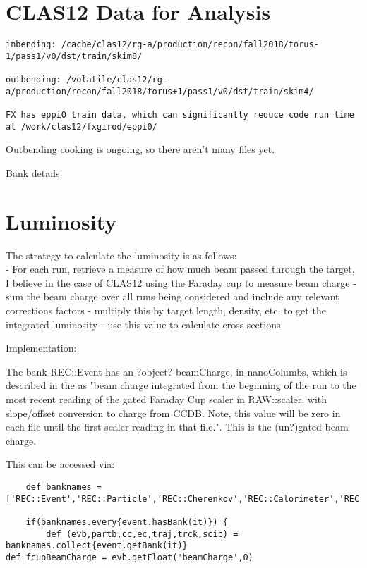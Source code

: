 \section{CLAS12 Data for Analysis}
\begin{lstlisting}
inbending: /cache/clas12/rg-a/production/recon/fall2018/torus-1/pass1/v0/dst/train/skim8/

outbending: /volatile/clas12/rg-a/production/recon/fall2018/torus+1/pass1/v0/dst/train/skim4/

FX has eppi0 train data, which can significantly reduce code run time at /work/clas12/fxgirod/eppi0/

\end{lstlisting}

Outbending cooking is ongoing, so there aren’t many files yet.


\href{https://clasweb.jlab.org/wiki/index.php/CLAS12_DSTs}{Bank details}


\section{Luminosity}

The strategy to calculate the luminosity is as follows:\\

 - For each run, retrieve a measure of how much beam passed through the target, I believe in the case of CLAS12 using the Faraday cup to measure beam charge
    - sum the beam charge over all runs being considered and include any relevant corrections factors
    - multiply this by target length, density, etc. to get the integrated luminosity
    - use this value to calculate cross sections.


Implementation:

The bank REC::Event has an ?object? beamCharge, in nanoColumbs, which is described in the \DST as "beam charge integrated from the beginning of the run to the most recent reading of the gated Faraday Cup scaler in RAW::scaler, with slope/offset conversion to charge from CCDB. Note, this value will be zero in each file until the first scaler reading in that file.". This is the (un?)gated beam charge. 


This can be accessed via:

\begin{lstlisting}
	def banknames = ['REC::Event','REC::Particle','REC::Cherenkov','REC::Calorimeter','REC::Traj','REC::Track','REC::Scintillator']

	if(banknames.every{event.hasBank(it)}) {
		def (evb,partb,cc,ec,traj,trck,scib) = banknames.collect{event.getBank(it)}
def fcupBeamCharge = evb.getFloat('beamCharge',0)
\end{lstlisting}

